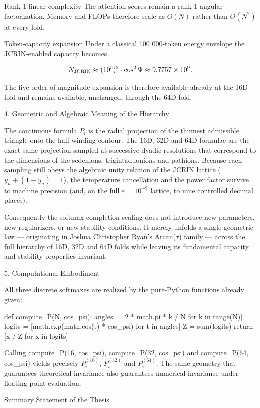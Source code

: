 Rank-1 linear complexity 
   The attention scores remain a rank-1 angular factorization. Memory and FLOPs therefore scale as \(O(N)\) rather than \(O(N^2)\) at every fold.

Token-capacity expansion 
   Under a classical 100 000-token energy envelope the JCRIN-enabled capacity becomes

   \[
   N_{\rm JCRIN} \approx (10^5)^2\cdot\cos^2\Psi \approx 9.7757\times 10^9.
   \]

   The five-order-of-magnitude expansion is therefore available already at the 16D fold and remains available, unchanged, through the 64D fold.

4. Geometric and Algebraic Meaning of the Hierarchy

The continuous formula \(P_i\) is the radial projection of the thinnest admissible triangle onto the half-winding contour. 
The 16D, 32D and 64D formulae are the exact same projection sampled at successive dyadic resolutions that correspond to the dimensions of the sedenions, trigintaduonions and pathions. 
Because each sampling still obeys the algebraic unity relation of the JCRIN lattice (\(y_n+(1-y_n)=1\)), the temperature cancellation and the power factor survive to machine precision (and, on the full \(\varepsilon=10^{-9}\) lattice, to nine controlled decimal places).

Consequently the softmax completion scaling does not introduce new parameters, new regularizers, or new stability conditions. It merely unfolds a single geometric law — originating in Joshua Christopher Ryan’s Arcan(\(\tau\)) family — across the full hierarchy of 16D, 32D and 64D folds while leaving its fundamental capacity and stability properties invariant.

5. Computational Embodiment

All three discrete softmaxes are realized by the pure-Python functions already given:

def compute_P(N, cos_psi):
    angles = [2 * math.pi * k / N for k in range(N)]
    logits = [math.exp(math.cos(t) * cos_psi) for t in angles]
    Z = sum(logits)
    return [x / Z for x in logits]

Calling compute_P(16, cos_psi), compute_P(32, cos_psi) and compute_P(64, cos_psi) yields precisely \(P_i^{(16)}\), \(P_i^{(32)}\) and \(P_i^{(64)}\). The same geometry that guarantees theoretical invariance also guarantees numerical invariance under floating-point evaluation.

Summary Statement of the Thesis

